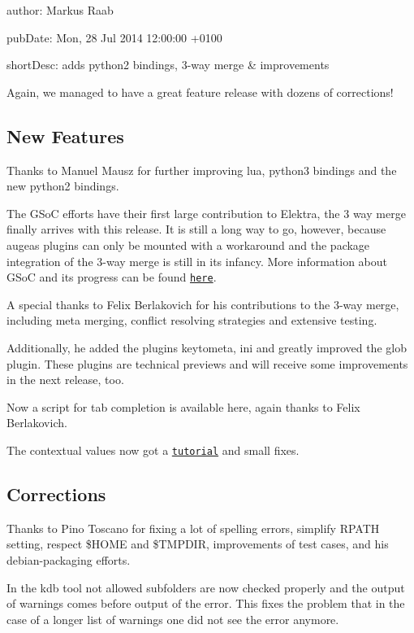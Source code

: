 
\begin{DoxyItemize}
\item author\+: Markus Raab
\item pub\+Date\+: Mon, 28 Jul 2014 12\+:00\+:00 +0100
\item short\+Desc\+: adds python2 bindings, 3-\/way merge \& improvements
\end{DoxyItemize}

Again, we managed to have a great feature release with dozens of corrections!

\subsection*{New Features}

Thanks to Manuel Mausz for further improving lua, python3 bindings and the new python2 bindings.

The G\+SoC efforts have their first large contribution to Elektra, the 3 way merge finally arrives with this release. It is still a long way to go, however, because augeas plugins can only be mounted with a workaround and the package integration of the 3-\/way merge is still in its infancy. More information about G\+SoC and its progress can be found \href{http://community.libelektra.org/wp}{\tt here}.

A special thanks to Felix Berlakovich for his contributions to the 3-\/way merge, including meta merging, conflict resolving strategies and extensive testing.

Additionally, he added the plugins keytometa, ini and greatly improved the glob plugin. These plugins are technical previews and will receive some improvements in the next release, too.

Now a script for tab completion is available here, again thanks to Felix Berlakovich.

The contextual values now got a \href{https://master.libelektra.org/src/tools/pythongen}{\tt tutorial} and small fixes.

\subsection*{Corrections}

Thanks to Pino Toscano for fixing a lot of spelling errors, simplify R\+P\+A\+TH setting, respect \$\+H\+O\+ME and \$\+T\+M\+P\+D\+IR, improvements of test cases, and his debian-\/packaging efforts.

In the kdb tool not allowed subfolders are now checked properly and the output of warnings comes before output of the error. This fixes the problem that in the case of a longer list of warnings one did not see the error anymore.

